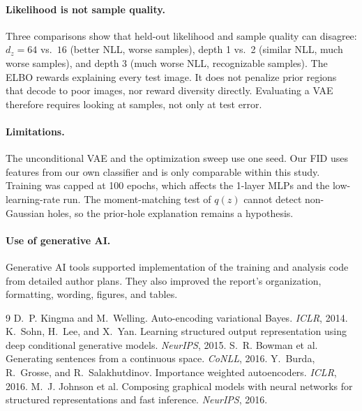 \documentclass[10pt]{article}
\begin{document}
\paragraph{Likelihood is not sample quality.} Three comparisons show that
held-out likelihood and sample quality can disagree:
$d_z=64$ vs.\ $16$ (better NLL, worse samples), depth 1 vs.\ 2
(similar NLL, much worse samples), and depth 3 (much worse NLL,
recognizable samples). The ELBO rewards explaining every test image. It does
not penalize prior regions that decode to poor images, nor reward diversity
directly. Evaluating a VAE therefore requires looking at samples, not only
at test error.

\paragraph{Limitations.} The unconditional VAE and the optimization sweep
use one seed. Our FID uses features from our own classifier and is only
comparable within this study. Training was capped at 100 epochs, which
affects the 1-layer MLPs and the low-learning-rate run. The moment-matching
test of $q(z)$ cannot detect non-Gaussian holes, so the prior-hole
explanation remains a hypothesis.

\paragraph{Use of generative AI.}
Generative AI tools supported implementation of the training and analysis
code from detailed author plans. They also improved the report's
organization, formatting, wording, figures, and tables.

\begin{thebibliography}{9}\small
{} D.~P. Kingma and M.~Welling. Auto-encoding variational
  Bayes. \emph{ICLR}, 2014.
 K.~Sohn, H.~Lee, and X.~Yan. Learning structured output
  representation using deep conditional generative models. \emph{NeurIPS},
  2015.
 S.~R. Bowman et al. Generating sentences from a
  continuous space. \emph{CoNLL}, 2016.
 Y.~Burda, R.~Grosse, and R.~Salakhutdinov. Importance
  weighted autoencoders. \emph{ICLR}, 2016.
 M.~J. Johnson et al. Composing graphical models with
  neural networks for structured representations and fast inference.
  \emph{NeurIPS}, 2016.
\end{thebibliography}
\end{document}
